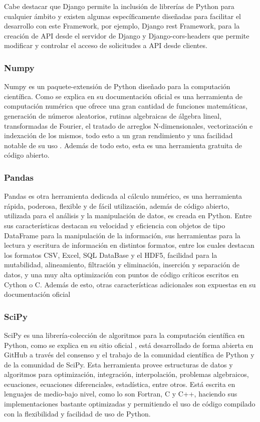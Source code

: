 Cabe destacar que Django permite la inclusión de librerías de Python para
cualquier ámbito y existen algunas específicamente diseñadas para facilitar el
desarrollo con este Framework, por ejemplo, Django rest Framework, para la
creación de API desde el servidor de Django  y Django-cors-headers que permite
modificar y controlar el acceso de solicitudes a API desde clientes.

\subsubsection{Numpy}

Numpy es un paquete-extensión de Python diseñado para la computación
científica. Como se explica en su documentación oficial \textcite{Numpy} es una
herramienta de computación numérica que ofrece una gran cantidad de  funciones
matemáticas, generación de números aleatorios, rutinas algebraicas de álgebra
lineal, transformadas de Fourier, el tratado de arreglos N-dimensionales,
vectorización e indexación de los mismos, todo esto a un gran rendimiento y una
facilidad notable de su uso . Además de todo esto, esta es una herramienta
gratuita de código abierto.

\subsubsection{Pandas}

Pandas es otra herramienta dedicada al cálculo numérico, es una herramienta
rápida, poderosa, flexible y de fácil utilización, además de código abierto,
utilizada para el análisis y la manipulación de datos, es creada en Python.
Entre sus características destacan su velocidad y eficiencia con objetos de
tipo DataFrame para la manipulación de la información, sus herramientas para la
lectura y escritura de información en distintos formatos, entre los cuales
destacan los formatos CSV, Excel, SQL DataBase y el HDF5, facilidad para la
mutabilidad, alineamiento, filtración y eliminación, inserción y separación de
datos, y una muy alta optimización con puntos de código críticos escritos en
Cython o C. Además de esto, otras características adicionales son expuestas en
su documentación oficial \textcite{PandasDocs}

\subsubsection{SciPy}
SciPy es una librería-colección de algoritmos para la computación científica en
Python, como se explica en su sitio oficial \textcite{Scipy}, está desarrollado de
forma abierta en GitHub a través del consenso y el trabajo de la comunidad
científica de Python y de la comunidad de SciPy. Esta herramienta provee estructuras
de datos y
algoritmos para optimización, integración, interpolación, problemas algebraicos,
ecuaciones, ecuaciones diferenciales, estadística, entre otros. Está escrita
en lenguajes de medio-bajo nivel, como lo son Fortran, C y C++, haciendo sus
implementaciones bastante optimizadas y permitiendo el uso de código compilado
con la flexibilidad y facilidad de uso de Python.

